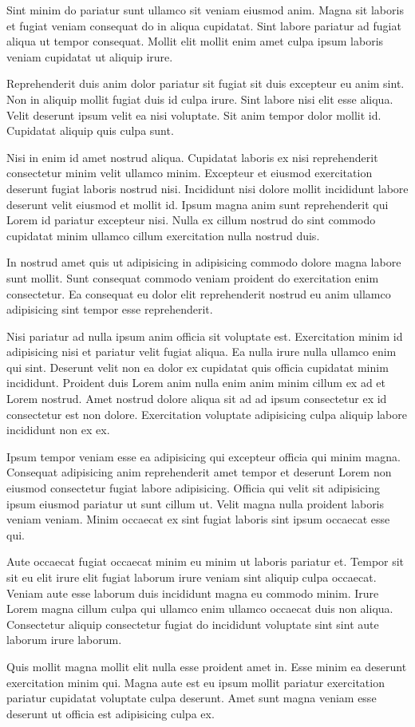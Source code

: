 Sint minim do pariatur sunt ullamco sit veniam eiusmod anim. Magna sit laboris et fugiat veniam consequat do in aliqua cupidatat. Sint labore pariatur ad fugiat aliqua ut tempor consequat. Mollit elit mollit enim amet culpa ipsum laboris veniam cupidatat ut aliquip irure.

Reprehenderit duis anim dolor pariatur sit fugiat sit duis excepteur eu anim sint. Non in aliquip mollit fugiat duis id culpa irure. Sint labore nisi elit esse aliqua. Velit deserunt ipsum velit ea nisi voluptate. Sit anim tempor dolor mollit id. Cupidatat aliquip quis culpa sunt.

Nisi in enim id amet nostrud aliqua. Cupidatat laboris ex nisi reprehenderit consectetur minim velit ullamco minim. Excepteur et eiusmod exercitation deserunt fugiat laboris nostrud nisi. Incididunt nisi dolore mollit incididunt labore deserunt velit eiusmod et mollit id. Ipsum magna anim sunt reprehenderit qui Lorem id pariatur excepteur nisi. Nulla ex cillum nostrud do sint commodo cupidatat minim ullamco cillum exercitation nulla nostrud duis.

In nostrud amet quis ut adipisicing in adipisicing commodo dolore magna labore sunt mollit. Sunt consequat commodo veniam proident do exercitation enim consectetur. Ea consequat eu dolor elit reprehenderit nostrud eu anim ullamco adipisicing sint tempor esse reprehenderit.

Nisi pariatur ad nulla ipsum anim officia sit voluptate est. Exercitation minim id adipisicing nisi et pariatur velit fugiat aliqua. Ea nulla irure nulla ullamco enim qui sint. Deserunt velit non ea dolor ex cupidatat quis officia cupidatat minim incididunt. Proident duis Lorem anim nulla enim anim minim cillum ex ad et Lorem nostrud. Amet nostrud dolore aliqua sit ad ad ipsum consectetur ex id consectetur est non dolore. Exercitation voluptate adipisicing culpa aliquip labore incididunt non ex ex.

Ipsum tempor veniam esse ea adipisicing qui excepteur officia qui minim magna. Consequat adipisicing anim reprehenderit amet tempor et deserunt Lorem non eiusmod consectetur fugiat labore adipisicing. Officia qui velit sit adipisicing ipsum eiusmod pariatur ut sunt cillum ut. Velit magna nulla proident laboris veniam veniam. Minim occaecat ex sint fugiat laboris sint ipsum occaecat esse qui.

Aute occaecat fugiat occaecat minim eu minim ut laboris pariatur et. Tempor sit sit eu elit irure elit fugiat laborum irure veniam sint aliquip culpa occaecat. Veniam aute esse laborum duis incididunt magna eu commodo minim. Irure Lorem magna cillum culpa qui ullamco enim ullamco occaecat duis non aliqua. Consectetur aliquip consectetur fugiat do incididunt voluptate sint sint aute laborum irure laborum.

Quis mollit magna mollit elit nulla esse proident amet in. Esse minim ea deserunt exercitation minim qui. Magna aute est eu ipsum mollit pariatur exercitation pariatur cupidatat voluptate culpa deserunt. Amet sunt magna veniam esse deserunt ut officia est adipisicing culpa ex.

